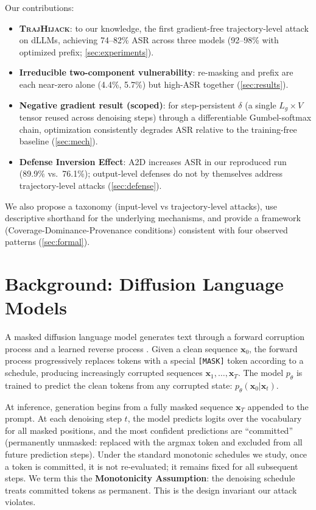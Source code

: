 \documentclass{article}
\theoremstyle{coloredthm}
\newcommand{\method}{\textsc{TrajHijack}}
\newcommand{\dllms}{dLLMs}
\newcommand{\maskid}{\texttt{[MASK]}}
\begin{document}
Our contributions:
\begin{itemize}
    \item \textbf{\method{}}: to our knowledge, the first gradient-free trajectory-level attack on \dllms{}, achieving 74--82\% ASR across three models (92--98\% with optimized prefix; \cref{sec:experiments}).
    \item \textbf{Irreducible two-component vulnerability}: re-masking and prefix are each near-zero alone (4.4\%, 5.7\%) but high-ASR together (\cref{sec:results}).
    \item \textbf{Negative gradient result (scoped)}: for step-persistent $\delta$ (a single $L_g \times V$ tensor reused across denoising steps) through a differentiable Gumbel-softmax chain, optimization consistently degrades ASR relative to the training-free baseline (\cref{sec:mech}).
    \item \textbf{Defense Inversion Effect}: A2D \citep{jeung2026a2d} increases ASR in our reproduced run (89.9\% vs.\ 76.1\%); output-level defenses do not by themselves address trajectory-level attacks (\cref{sec:defense}).
\end{itemize}
We also propose a taxonomy (input-level vs trajectory-level attacks), use descriptive shorthand for the underlying mechanisms, and provide a framework (Coverage-Dominance-Provenance conditions) consistent with four observed patterns (\cref{sec:formal}).

\section{Background: Diffusion Language Models}

A masked diffusion language model generates text through a forward corruption process and a learned reverse process \citep{austin2021d3pm, sahoo2024simple}. Given a clean sequence $\mathbf{x}_0$, the forward process progressively replaces tokens with a special \maskid{} token according to a schedule, producing increasingly corrupted sequences $\mathbf{x}_1, \ldots, \mathbf{x}_T$. The model $p_\theta$ is trained to predict the clean tokens from any corrupted state: $p_\theta(\mathbf{x}_0 | \mathbf{x}_t)$.

At inference, generation begins from a fully masked sequence $\mathbf{x}_T$ appended to the prompt. At each denoising step $t$, the model predicts logits over the vocabulary for all masked positions, and the most confident predictions are ``committed'' (permanently unmasked: replaced with the argmax token and excluded from all future prediction steps). Under the standard monotonic schedules we study, once a token is committed, it is not re-evaluated; it remains fixed for all subsequent steps. We term this the \textbf{Monotonicity Assumption}: the denoising schedule treats committed tokens as permanent. This is the design invariant our attack violates.
\end{document}

